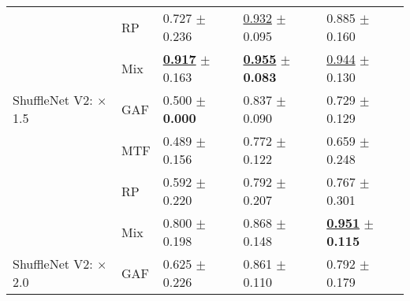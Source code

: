 \begin{tabular}[t]{lllll}
 & RP & \textcolor[rgb]{0.4266211604,0.5000000000,0}{0.727} $\pm$ \textcolor[rgb]{0.9474755531,0.0525244469,0}{0.236} & \underline{\textcolor[rgb]{0.0886469673,0.5000000000,0}{0.932}} $\pm$ \textcolor[rgb]{0.0836404647,0.5000000000,0}{0.095} & \textcolor[rgb]{0.2045009785,0.5000000000,0}{0.885} $\pm$ \textcolor[rgb]{0.1862448196,0.5000000000,0}{0.160} \\
 & Mix & \underline{\textbf{\textcolor[rgb]{0.0000000000,0.5000000000,0}{0.917}}} $\pm$ \textcolor[rgb]{0.6538202475,0.3461797525,0}{0.163} & \underline{\textbf{\textcolor[rgb]{0.0000000000,0.5000000000,0}{0.955}}} $\pm$ \textbf{\textcolor[rgb]{0.0000000000,0.5000000000,0}{0.083}} & \underline{\textcolor[rgb]{0.0215264188,0.5000000000,0}{0.944}} $\pm$ \textcolor[rgb]{0.0609939296,0.5000000000,0}{0.130} \\
ShuffleNet V2: $\times$1.5 & GAF & \textcolor[rgb]{0.9385665529,0.0614334471,0}{0.500} $\pm$ \textbf{\textcolor[rgb]{0.0000000000,0.5000000000,0}{0.000}} & \textcolor[rgb]{0.4603421462,0.5000000000,0}{0.837} $\pm$ \textcolor[rgb]{0.0445462134,0.5000000000,0}{0.090} & \textcolor[rgb]{0.6888454012,0.3111545988,0}{0.729} $\pm$ \textcolor[rgb]{0.0568103794,0.5000000000,0}{0.129} \\
 & MTF & \textcolor[rgb]{0.9635949943,0.0364050057,0}{0.489} $\pm$ \textcolor[rgb]{0.6279873475,0.3720126525,0}{0.156} & \textcolor[rgb]{0.7166407465,0.2833592535,0}{0.772} $\pm$ \textcolor[rgb]{0.2659333763,0.5000000000,0}{0.122} & \textcolor[rgb]{0.9060665362,0.0939334638,0}{0.659} $\pm$ \textcolor[rgb]{0.5490881212,0.4509118788,0}{0.248} \\
 & RP & \textcolor[rgb]{0.7320819113,0.2679180887,0}{0.592} $\pm$ \textcolor[rgb]{0.8848167965,0.1151832035,0}{0.220} & \textcolor[rgb]{0.6376360809,0.3623639191,0}{0.792} $\pm$ \textcolor[rgb]{0.8451766078,0.1548233922,0}{0.207} & \textcolor[rgb]{0.5726027397,0.4273972603,0}{0.767} $\pm$ \textcolor[rgb]{0.7659479182,0.2340520818,0}{0.301} \\
 & Mix & \textcolor[rgb]{0.2627986348,0.5000000000,0}{0.800} $\pm$ \textcolor[rgb]{0.7938696415,0.2061303585,0}{0.198} & \textcolor[rgb]{0.3405909798,0.5000000000,0}{0.868} $\pm$ \textcolor[rgb]{0.4439252882,0.5000000000,0}{0.148} & \underline{\textbf{\textcolor[rgb]{0.0000000000,0.5000000000,0}{0.951}}} $\pm$ \textbf{\textcolor[rgb]{0.0000000000,0.5000000000,0}{0.115}} \\
ShuffleNet V2: $\times$2.0 & GAF & \textcolor[rgb]{0.6569965870,0.3430034130,0}{0.625} $\pm$ \textcolor[rgb]{0.9079798901,0.0920201099,0}{0.226} & \textcolor[rgb]{0.3670295490,0.5000000000,0}{0.861} $\pm$ \textcolor[rgb]{0.1853579081,0.5000000000,0}{0.110} & \textcolor[rgb]{0.4951076321,0.5000000000,0}{0.792} $\pm$ \textcolor[rgb]{0.2652475447,0.5000000000,0}{0.179} \\

\end{tabular}
